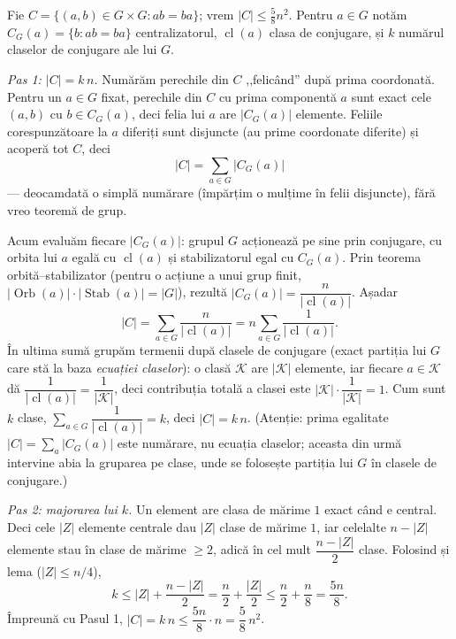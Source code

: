 \begin{solutie}
Fie $C=\{(a,b)\in G\times G:ab=ba\}$; vrem $|C|\le\tfrac58 n^{2}$. Pentru
$a\in G$ notăm $C_{G}(a)=\{b:ab=ba\}$ centralizatorul, $\operatorname{cl}(a)$
clasa de conjugare, și $k$ numărul claselor de conjugare ale lui $G$.

\smallskip
\textit{Pas 1: $|C|=k\,n$.} Numărăm perechile din $C$ ,,felicând''
după prima coordonată. Pentru un $a\in G$ fixat, perechile din $C$ cu
prima componentă $a$ sunt exact cele $(a,b)$ cu $b\in C_{G}(a)$, deci felia
lui $a$ are $|C_{G}(a)|$ elemente. Feliile corespunzătoare la $a$ diferiți
sunt disjuncte (au prime coordonate diferite) și acoperă tot $C$, deci
\[
  |C|=\sum_{a\in G}|C_{G}(a)|
\]
--- deocamdată o simplă numărare (împărțim o mulțime
în felii disjuncte), fără vreo teoremă de grup.

Acum evaluăm fiecare $|C_{G}(a)|$: grupul $G$ acționează pe sine
prin conjugare, cu orbita lui $a$ egală cu $\operatorname{cl}(a)$ și
stabilizatorul egal cu $C_{G}(a)$. Prin teorema orbită--stabilizator
(pentru o acțiune a unui grup finit, $|\!\operatorname{Orb}(a)|\cdot
|\!\operatorname{Stab}(a)|=|G|$), rezultă
$|C_{G}(a)|=\dfrac{n}{|\operatorname{cl}(a)|}$. Așadar
\[
  |C|=\sum_{a\in G}\frac{n}{|\operatorname{cl}(a)|}
     =n\sum_{a\in G}\frac{1}{|\operatorname{cl}(a)|}.
\]
În ultima sumă grupăm termenii după clasele de conjugare
(exact partiția lui $G$ care stă la baza \emph{ecuației claselor}):
o clasă $\mathcal K$ are $|\mathcal K|$ elemente, iar fiecare $a\in\mathcal K$
dă $\dfrac{1}{|\operatorname{cl}(a)|}=\dfrac{1}{|\mathcal K|}$, deci
contribuția totală a clasei este $|\mathcal K|\cdot\dfrac{1}{|\mathcal K|}=1$.
Cum sunt $k$ clase, $\sum_{a\in G}\dfrac{1}{|\operatorname{cl}(a)|}=k$, deci
$|C|=k\,n$. (Atenție: prima egalitate $|C|=\sum_a|C_G(a)|$ este numărare,
nu ecuația claselor; aceasta din urmă intervine abia la gruparea pe
clase, unde se folosește partiția lui $G$ în clasele de conjugare.)

\smallskip
\textit{Pas 2: majorarea lui $k$.} Un element are clasa de mărime $1$
exact când e central. Deci cele $|Z|$ elemente centrale dau $|Z|$ clase de
mărime $1$, iar celelalte $n-|Z|$ elemente stau în clase de mărime
$\ge 2$, adică în cel mult $\dfrac{n-|Z|}{2}$ clase. Folosind
și lema ($|Z|\le n/4$),
\[
  k\le |Z|+\frac{n-|Z|}{2}=\frac{n}{2}+\frac{|Z|}{2}
   \le \frac{n}{2}+\frac{n}{8}=\frac{5n}{8}.
\]
Împreună cu Pasul 1, $|C|=k\,n\le\dfrac{5n}{8}\cdot n=\dfrac{5}{8}\,n^{2}$.
\end{solutie}

